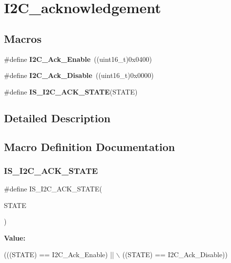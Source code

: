 \hypertarget{group___i2_c__acknowledgement}{}\section{I2\+C\+\_\+acknowledgement}
\label{group___i2_c__acknowledgement}
\subsection*{Macros}
\begin{DoxyCompactItemize}
\item 
\mbox{\label{group___i2_c__acknowledgement_ga616466f8ef5a47237cdbf7ac578ec507}} 
\#define {\bfseries I2\+C\+\_\+\+Ack\+\_\+\+Enable}~((uint16\+\_\+t)0x0400)
\item 
\mbox{\label{group___i2_c__acknowledgement_gadb5f47c052ac6bae1aa58c724e339e36}} 
\#define {\bfseries I2\+C\+\_\+\+Ack\+\_\+\+Disable}~((uint16\+\_\+t)0x0000)
\item 
\#define {\bfseries I\+S\+\_\+\+I2\+C\+\_\+\+A\+C\+K\+\_\+\+S\+T\+A\+TE}(S\+T\+A\+TE)
\end{DoxyCompactItemize}


\subsection{Detailed Description}


\subsection{Macro Definition Documentation}
\mbox{\label{group___i2_c__acknowledgement_ga6401bedc842e784a2bb78b3aa21af19d}} 
\subsubsection{\texorpdfstring{I\+S\+\_\+\+I2\+C\+\_\+\+A\+C\+K\+\_\+\+S\+T\+A\+TE}{IS\_I2C\_ACK\_STATE}}
{\footnotesize\ttfamily \#define I\+S\+\_\+\+I2\+C\+\_\+\+A\+C\+K\+\_\+\+S\+T\+A\+TE(\begin{DoxyParamCaption}\item[{}]{S\+T\+A\+TE }\end{DoxyParamCaption})}

{\bfseries Value\+:}
\begin{DoxyCode}
(((STATE) == I2C\_Ack\_Enable) || \(\backslash\)
                                 ((STATE) == I2C\_Ack\_Disable))
\end{DoxyCode}

